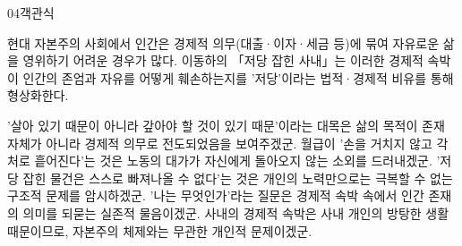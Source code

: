\documentclass[fs85,seriesWit]{korfarm-base}
\begin{document}
\begin{kfQBlock}{04}{객관식}
\begin{kfEvidence}현대 자본주의 사회에서 인간은 경제적 의무(대출·이자·세금 등)에 묶여 자유로운 삶을 영위하기 어려운 경우가 많다. 이동하의 「저당 잡힌 사내」는 이러한 경제적 속박이 인간의 존엄과 자유를 어떻게 훼손하는지를 '저당'이라는 법적·경제적 비유를 통해 형상화한다.\end{kfEvidence}
\begin{kfChoices}
\kfChoice '살아 있기 때문이 아니라 갚아야 할 것이 있기 때문'이라는 대목은 삶의 목적이 존재 자체가 아니라 경제적 의무로 전도되었음을 보여주겠군.
\kfChoice 월급이 '손을 거치지 않고 각처로 흩어진다'는 것은 노동의 대가가 자신에게 돌아오지 않는 소외를 드러내겠군.
\kfChoice '저당 잡힌 물건은 스스로 빠져나올 수 없다'는 것은 개인의 노력만으로는 극복할 수 없는 구조적 문제를 암시하겠군.
\kfChoice '나는 무엇인가'라는 질문은 경제적 속박 속에서 인간 존재의 의미를 되묻는 실존적 물음이겠군.
\kfChoice 사내의 경제적 속박은 사내 개인의 방탕한 생활 때문이므로, 자본주의 체제와는 무관한 개인적 문제이겠군.
\end{kfChoices}
\end{kfQBlock}

\kfEndMC

\end{document}
